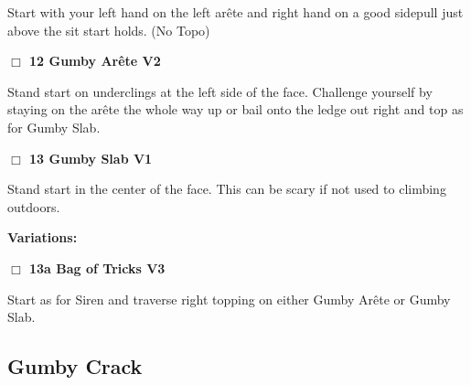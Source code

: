 \begin{multicols}{2}
\begin{adjustwidth}{0.5cm}{}
\begin{adjustwidth}{1.3em}{}
Start with your left hand on the left arête and right hand on a good sidepull just above the sit start holds.
  (No Topo)
\end{adjustwidth}



\end{adjustwidth}


\needspace{2em}
\label{rt:Gumby Arête}
\colorbox{green!20}{
\parbox{0.95\linewidth}{
\hspace{-1ex}\textbf{$\Box$
12 Gumby Arête V2  
}}}
\begin{adjustwidth}{1.3em}{}			

Stand start on underclings at the left side of the face. Challenge yourself by staying on the arête the whole way up or bail onto the ledge out right and top as for Gumby Slab.
\end{adjustwidth}




\needspace{2em}
\label{rt:Gumby Slab}
\colorbox{green!20}{
\parbox{0.95\linewidth}{
\hspace{-1ex}\textbf{$\Box$
13 Gumby Slab V1  
}}}
\begin{adjustwidth}{1.3em}{}			

Stand start in the center of the face. This can be scary if not used to climbing outdoors.
\end{adjustwidth}


\begin{adjustwidth}{0.5cm}{}				
\needspace{4em}
\textbf{Variations:} \newline

\needspace{2em}
\label{vr:Bag of Tricks}
\colorbox{green!20}{
\parbox{0.95\linewidth}{
\hspace{-1ex}\textbf{$\Box$
13a Bag of Tricks V3  
}}}
\begin{adjustwidth}{1.3em}{}			

Start as for Siren and traverse right topping on either Gumby Arête or Gumby Slab.
\end{adjustwidth}



\end{adjustwidth}



\needspace{10em}
\subsection*{Gumby Crack}\label{bf:Gumby Crack}


\end{multicols}
